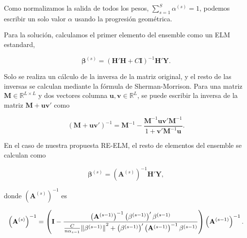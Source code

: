 \documentclass{beamer}
\begin{document}
{	Como normalizamos la salida de todos los pesos, $\sum_{s=1}^S \alpha^{(s)} = 1$, podemos escribir un solo valor $\alpha$ usando la progresión geométrica.
	
	 
	 
	 Para la solución, calculamos el primer elemento del ensemble como un ELM estandard,

	 \begin{equation}
	 \label{eq:solucion_elm}
	 \mathbf{\beta}^{(s)} = \left( \mathbf{H}' \mathbf{H} + C \mathbf{I} \right)^{-1} \mathbf{H}' \mathbf{Y}.
	 \end{equation}
	 
	 Solo se realiza un cálculo de la inversa de la matriz original, y el resto de las inversas se calculan mediante la fórmula de Sherman-Morrison\cite{hager1989updating}. Para una matriz $\mathbf{M} \in \mathbb{R}^{L \times L}$ y dos vectores columna $\mathbf{u}, \mathbf{v} \in \mathbb{R}^{L}$, se puede escribir la inversa de la matriz $\mathbf{M} + \mathbf{u} \mathbf{v}'$ como
	 
	 \begin{equation}
	 \label{eq:sherman-morrison}
	 {\left( \mathbf{M} + \mathbf{u} \mathbf{v}' \right)}^{-1} = \mathbf{M}^{-1} - \frac{\mathbf{M}^{-1} \mathbf{u} \mathbf{v}' \mathbf{M}^{-1}}{1 + \mathbf{v}' \mathbf{M}^{-1} \mathbf{u} }.
	 \end{equation}
	 
	 En el caso de nuestra propuesta RE-ELM, el resto de elementos del ensemble se calculan como
	 
	 
	 \begin{equation}
	 \mathbf{\beta}^{(s)} = \left(\mathbf{A}^{(s)}\right)^{-1}\mathbf{H}'\mathbf{Y},
	 \end{equation}
	 
	 donde $\left(\mathbf{A}^{(s)}\right)^{-1}$ es
	 
	 \begin{equation}
	 \tiny
\left(\mathbf{A}^{(s)}\right)^{-1} =
\left(\mathbf{I} - \frac{ \left(\mathbf{A}^{(s-1)}\right)^{-1}  \left(\mathbf{\beta}^{(s-1)} \right)'\mathbf{\beta}^{(s-1)}}{{ \frac{C}{n \alpha_{s-1}} \lVert \mathbf{\beta}^{(s-1)} \rVert}^{2} + \left(\mathbf{\beta}^{(s-1)} \right)' \left(\mathbf{A}^{(s-1)}\right)^{-1} \mathbf{\beta}^{(s-1)}}   \right)\left(\mathbf{A}^{(s-1)}\right)^{-1}.
\end{equation}



%

}
\end{document}
